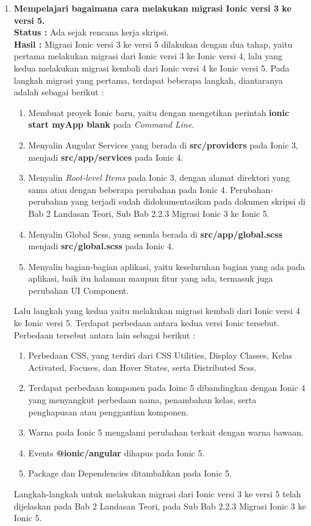 \documentclass[a4paper,twoside]{article}
\begin{document}
\begin{enumerate}
		\item \textbf{Mempelajari bagaimana cara melakukan migrasi Ionic versi 3 ke versi 5.}\\
		{\bf Status :} Ada sejak rencana kerja skripsi.\\
		{\bf Hasil :} Migrasi Ionic versi 3 ke versi 5 dilakukan dengan dua tahap, yaitu pertama melakukan migrasi dari Ionic versi 3 ke Ionic versi 4, lalu yang kedua melakukan migrasi kembali dari Ionic versi 4 ke Ionic versi 5. Pada langkah migrasi yang pertama, terdapat beberapa langkah, diantaranya adalah sebagai berikut :
		\begin{enumerate}
			\item Membuat proyek Ionic baru, yaitu dengan mengetikan perintah \textbf{ionic start myApp blank} pada \textit{Command Line}.
			\item Menyalin Angular Services yang berada di \textbf{src/providers} pada Ionic 3, menjadi \textbf{src/app/services} pada Ionic 4.
			\item Menyalin \textit{Root-level Items} pada Ionic 3, dengan alamat direktori yang sama atau dengan beberapa perubahan pada Ionic 4. Perubahan-perubahan yang terjadi sudah didokumentasikan pada dokumen skripsi di Bab 2 Landasan Teori, Sub Bab 2.2.3 Migrasi Ionic 3 ke Ionic 5.
			\item Menyalin Global Scss, yang semula berada di \textbf{src/app/global.scss} menjadi \textbf{src/global.scss} pada Ionic 4.
			\item Menyalin bagian-bagian aplikasi, yaitu keseluruhan bagian yang ada pada aplikasi, baik itu halaman maupun fitur yang ada, termasuk juga perubahan UI Component.
		\end{enumerate}
		 
		Lalu langkah yang kedua yaitu melakukan migrasi kembali dari Ionic versi 4 ke Ionic versi 5. Terdapat perbedaan antara kedua versi Ionic tersebut. Perbedaan tersebut antara lain sebagai berikut :
		\begin{enumerate}
			\item Perbedaan CSS, yang terdiri dari CSS Utilities, Display Classes, Kelas Activated, Focuses, dan Hover States, serta Distributed Scss.
			\item Terdapat perbedaan komponen pada Ioinc 5 dibandingkan dengan Ionic 4 yang menyangkut perbedaan nama, penambahan kelas, serta penghapusan atau penggantian komponen.
			\item Warna pada Ionic 5 mengalami perubahan terkait dengan warna bawaan.
			\item Events \textbf{@ionic/angular} dihapus pada Ionic 5.
			\item Package dan Dependencies ditambahkan pada Ionic 5.
		\end{enumerate}				
		Langkah-langkah untuk melakukan migrasi dari Ionic versi 3 ke versi 5 telah dijelaskan pada Bab 2 Landasan Teori, pada Sub Bab 2.2.3 Migrasi Ionic 3 ke Ionic 5.
		

\end{enumerate}
\end{document}
